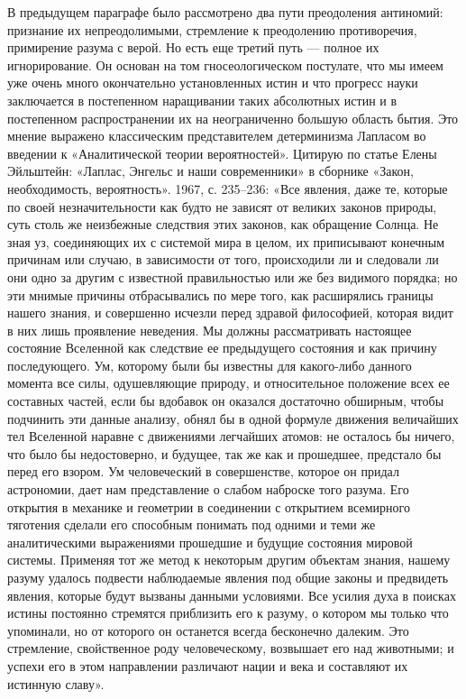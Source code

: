 В предыдущем параграфе было рассмотрено два пути преодоления антиномий:
признание их непреодолимыми, стремление к преодолению противоречия, примирение
разума с верой. Но есть еще третий путь --- полное их игнорирование. Он основан
на том гносеологическом постулате, что мы имеем уже очень много окончательно
установленных истин и что прогресс науки заключается в постепенном наращивании
таких абсолютных истин и в постепенном распространении их на неограниченно
большую область бытия. Это мнение выражено классическим представителем
детерминизма Лапласом во введении к «Аналитической теории вероятностей».
Цитирую по статье Елены Эйльштейн: «Лаплас, Энгельс и наши современники» в
сборнике «Закон, необходимость, вероятность». 1967, с. 235--236: «Все явления,
даже те, которые по своей незначительности как будто не зависят от великих
законов природы, суть столь же неизбежные следствия этих законов, как обращение
Солнца. Не зная уз, соединяющих их с системой мира в целом, их приписывают
конечным причинам или случаю, в зависимости от того, происходили ли и следовали
ли они одно за другим с известной правильностью или же без видимого порядка; но
эти мнимые причины отбрасывались по мере того, как расширялись границы нашего
знания, и совершенно исчезли перед здравой философией, которая видит в них лишь
проявление неведения. Мы должны рассматривать настоящее состояние Вселенной как
следствие ее предыдущего состояния и как причину последующего. Ум, которому
были бы известны для какого-либо данного момента все силы, одушевляющие
природу, и относительное положение всех ее составных частей, если бы вдобавок
он оказался достаточно обширным, чтобы подчинить эти данные анализу, обнял бы в
одной формуле движения величайших тел Вселенной наравне с движениями легчайших
атомов: не осталось бы ничего, что было бы недостоверно, и будущее, так же как
и прошедшее, предстало бы перед его взором. Ум человеческий в совершенстве,
которое он придал астрономии, дает нам представление о слабом наброске того
разума. Его открытия в механике и геометрии в соединении с открытием всемирного
тяготения сделали его способным понимать под одними и теми же аналитическими
выражениями прошедшие и будущие состояния мировой системы. Применяя тот же
метод к некоторым другим объектам знания, нашему разуму удалось подвести
наблюдаемые явления под общие законы и предвидеть явления, которые будут
вызваны данными условиями. Все усилия духа в поисках истины постоянно стремятся
приблизить его к разуму, о котором мы только что упоминали, но от которого он
останется всегда бесконечно далеким. Это стремление, свойственное роду
человеческому, возвышает его над животными; и успехи его в этом направлении
различают нации и века и составляют их истинную славу».

